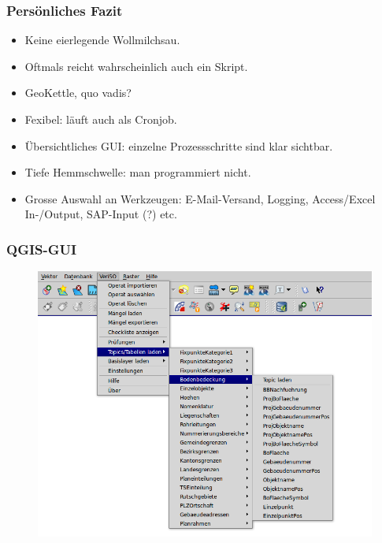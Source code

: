 \documentclass{beamer}
\begin{document}
\begin{frame}
  \frametitle{Persönliches Fazit}
  \begin{itemize}
  \item Keine eierlegende Wollmilchsau.
  \item Oftmals reicht wahrscheinlich auch ein Skript.
  \item GeoKettle, quo vadis?
 \end{itemize}
  \begin{itemize}
  \item Fexibel: läuft auch als Cronjob.
  \item Übersichtliches GUI: einzelne Prozessschritte sind klar sichtbar.
  \item Tiefe Hemmschwelle: man programmiert nicht.
  \item Grosse Auswahl an Werkzeugen: E-Mail-Versand, Logging, Access/Excel In-/Output, SAP-Input (?) etc.
 \end{itemize}
\end{frame}


\begin{frame}
  \frametitle{QGIS-GUI}
  \begin{figure}
    \includegraphics[scale=0.35]{bilder/veriso_topic_loader_3.png}
  \end{figure}
\end{frame}
\end{document}
